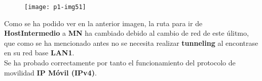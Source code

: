 \documentclass[10pt]{article}
\begin{document}
\begin{figure}[H]
	\begin{center}
 		\texttt{[image: p1-img51]}
	\end{center} 
\end{figure}

Como se ha podido ver en la anterior imagen, la ruta para ir de \textbf{HostIntermedio} a \textbf{MN} ha cambiado debido al cambio de red de este úlitmo, que como se ha mencionado antes no se necesita realizar \textbf{tunneling} al encontrase en su red base \textbf{LAN1}. \\

Se ha probado correctamente por tanto el funcionamiento del protocolo de movilidad \textbf{IP Móvil (IPv4)}.
\end{document}
